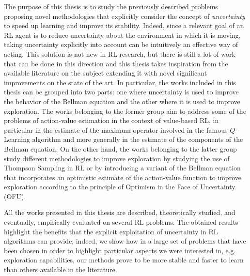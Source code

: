 The purpose of this thesis is to study the previously described problems proposing novel methodologies that explicitly consider the concept of \textit{uncertainty} to speed up learning and improve its stability. Indeed, since a relevant goal of an RL agent is to reduce uncertainty about the environment in which it is moving, taking uncertainty explicitly into account can be intuitively an effective way of acting. This solution is not new in RL research, but there is still a lot of work that can be done in this direction and this thesis takes inspiration from the available literature on the subject extending it with novel significant improvements on the state of the art. In particular, the works included in this thesis can be grouped into two parts: one where uncertainty is used to improve the behavior of the Bellman equation and the other where it is used to improve exploration. The works belonging to the former group aim to address some of the problems of action-value estimation in the context of value-based RL, in particular in the estimate of the maximum operator involved in the famous $Q$-Learning algorithm and more generally in the estimate of the components of the Bellman equation. On the other hand, the works belonging to the latter group study different methodologies to improve exploration by studying the use of Thompson Sampling in RL or by introducing a variant of the Bellman equation that incorporates an optimistic estimate of the action-value function to improve exploration according to the principle of Optimism in the Face of Uncertainty (OFU).

All the works presented in this thesis are described, theoretically studied, and eventually, empirically evaluated on several RL problems. The obtained results highlight the benefits that the explicit exploitation of uncertainty in RL algorithms can provide; indeed, we show how in a large set of problems that have been chosen in order to highlight particular aspects we were interested in, e.g. exploration capabilities, our methods prove to be more stable and faster to learn than others available in the literature.
